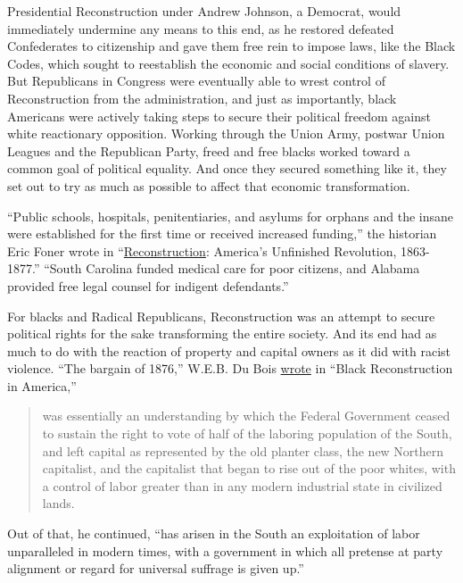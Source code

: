 Presidential Reconstruction under Andrew Johnson, a Democrat, would
immediately undermine any means to this end, as he restored defeated
Confederates to citizenship and gave them free rein to impose laws, like
the Black Codes, which sought to reestablish the economic and social
conditions of slavery. But Republicans in Congress were eventually able
to wrest control of Reconstruction from the administration, and just as
importantly, black Americans were actively taking steps to secure their
political freedom against white reactionary opposition. Working through
the Union Army, postwar Union Leagues and the Republican Party, freed
and free blacks worked toward a common goal of political equality. And
once they secured something like it, they set out to try as much as
possible to affect that economic transformation.

``Public schools, hospitals, penitentiaries, and asylums for orphans and
the insane were established for the first time or received increased
funding,'' the historian Eric Foner wrote in
``\href{https://www.harpercollins.com/9780062354518/reconstruction-updated-edition/}{Reconstruction}:
America's Unfinished Revolution, 1863-1877.'' ``South Carolina funded
medical care for poor citizens, and Alabama provided free legal counsel
for indigent defendants.''

For blacks and Radical Republicans, Reconstruction was an attempt to
secure political rights for the sake transforming the entire society.
And its end had as much to do with the reaction of property and capital
owners as it did with racist violence. ``The bargain of 1876,'' W.E.B.
Du Bois
\href{https://www.google.com/books/edition/Black_Reconstruction_in_America/IqDEhQtoYEkC?hl=en\&gbpv=1\&pg=PA563\&printsec=frontcover\&bsq=ceased}{wrote}
in ``Black Reconstruction in America,''

\begin{quote}
was essentially an understanding by which the Federal Government ceased
to sustain the right to vote of half of the laboring population of the
South, and left capital as represented by the old planter class, the new
Northern capitalist, and the capitalist that began to rise out of the
poor whites, with a control of labor greater than in any modern
industrial state in civilized lands.
\end{quote}

Out of that, he continued, ``has arisen in the South an exploitation of
labor unparalleled in modern times, with a government in which all
pretense at party alignment or regard for universal suffrage is given
up.''

